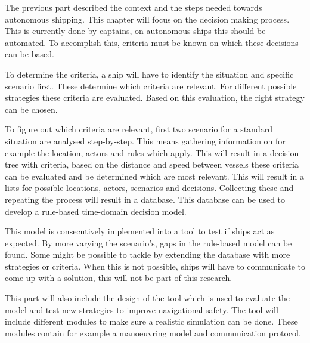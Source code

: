 The previous part described the context and the steps needed towards autonomous shipping. This chapter will focus on the decision making process. This is currently done by captains, on autonomous ships this should be automated. To accomplish this, criteria must be known on which these decisions can be based. 

To determine the criteria, a ship will have to identify the situation and specific scenario first. These determine which criteria are relevant. For different possible strategies these criteria are evaluated. Based on this evaluation, the right strategy can be chosen.

To figure out which criteria are relevant, first two scenario for a standard situation are analysed step-by-step. This means gathering information on for example the location, actors and rules which apply. This will result in a decision tree with criteria, based on the distance and speed between vessels these criteria can be evaluated and be determined which are most relevant. 
This will result in a lists for possible locations, actors, scenarios and decisions. Collecting these and repeating the process will result in a database. This database can be used to develop a rule-based time-domain decision model. 

This model is consecutively implemented into a tool to test if ships act as expected. By more varying the scenario's, gaps in the rule-based model can be found. Some might be possible to tackle by extending the database with more strategies or criteria. When this is not possible, ships will have to communicate to come-up with a solution, this will not be part of this research.

This part will also include the design of the tool which is used to evaluate the model and test new strategies to improve navigational safety. The tool will include different modules to make sure a realistic simulation can be done. These modules contain for example a manoeuvring model and communication protocol.

